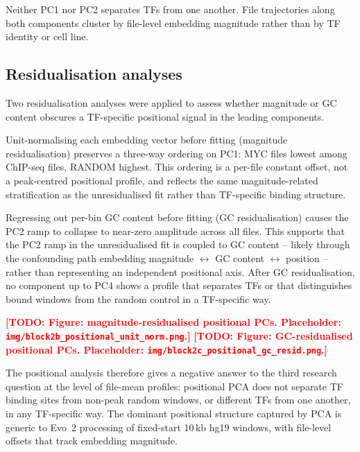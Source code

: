 \documentclass[12pt,a4paper,twoside,final]{book}
\newcommand{\todo}[1]{\textcolor{red}{\textbf{[TODO: #1]}}}
\begin{document}
Neither PC1 nor PC2 separates TFs from one another.
File trajectories along both components cluster by file-level embedding magnitude rather than by TF identity or cell line. %

\subsection{Residualisation analyses}

Two residualisation analyses were applied to assess whether magnitude or GC content obscures a TF-specific positional signal in the leading components.

Unit-normalising each embedding vector before fitting (magnitude residualisation) preserves a three-way ordering on PC1: MYC files lowest among ChIP-seq files, RANDOM highest. %
This ordering is a per-file constant offset, not a peak-centred positional profile, and reflects the same magnitude-related stratification as the unresidualised fit rather than TF-specific binding structure. %

Regressing out per-bin GC content before fitting (GC residualisation) causes the PC2 ramp to collapse to near-zero amplitude across all files.
This supports that the PC2 ramp in the unresidualised fit is coupled to GC content -- likely through the confounding path embedding magnitude $\leftrightarrow$ GC content $\leftrightarrow$ position -- rather than representing an independent positional axis.
After GC residualisation, no component up to PC4 shows a profile that separates TFs or that distinguishes bound windows from the random control in a TF-specific way. %

\todo{Figure: magnitude-residualised positional PCs. Placeholder: \texttt{img/block2b\_positional\_unit\_norm.png}.}
\todo{Figure: GC-residualised positional PCs. Placeholder: \texttt{img/block2c\_positional\_gc\_resid.png}.}

The positional analysis therefore gives a negative answer to the third research question at the level of file-mean profiles: positional PCA does not separate TF binding sites from non-peak random windows, or different TFs from one another, in any TF-specific way. %
The dominant positional structure captured by PCA is generic to Evo~2 processing of fixed-start 10\,kb hg19 windows, with file-level offsets that track embedding magnitude. %
\end{document}
